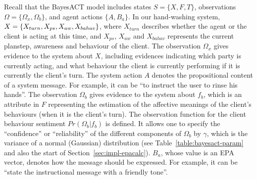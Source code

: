 Recall that the BayesACT model includes states $S = \{X, F, T\}$, observations $\Omega = \{\Omega_{x}, \Omega_{b}\}$, and agent actions $\{A, B_{a}\}$. In our hand-washing system, $X = \{X_{turn}, X_{ps}, X_{aw}, \\ X_{bahav}\}$, where $X_{turn}$ describes whether the agent or the client is acting at this time, and $X_{ps}$, $X_{aw}$ and $X_{bahav}$ represents the current planstep, awareness and behaviour of the client. The observation $\Omega_{x}$ gives evidence to the system about $X$, including evidences indicating which party is currently acting, and what behaviour the client is currently performing if it is currently the client's turn. The system action $A$ denotes the propositional content of a system message. For example, it can be ``to instruct the user to rinse his hands''. The observation $\Omega_{b}$ gives evidence to the system about $f_b$, which is an attribute in $F$ representing the estimation of the affective meanings of the client's behaviours (when it is the client's turn). The observation function for the client behaviour sentiment $Pr(\Omega_b|f_b)$ is defined. It allows one to specify the ``confidence'' or ``reliability'' of the different components of $\Omega_b$ by $\gamma$, which is the variance of a normal (Gaussian) distribution (see Table~\ref{table:bayesact-param} and also the start of Section~\ref{sec:impl-epacalc}). $B_{a}$, whose value is an EPA vector, denotes how the message should be expressed. For example, it can be ``state the instructional message with a friendly tone''. 

